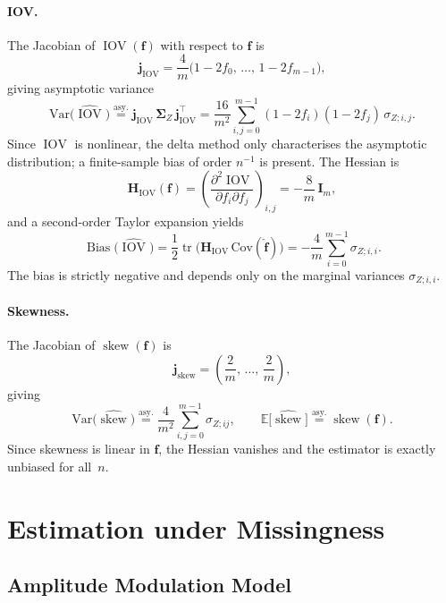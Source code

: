 \documentclass[12pt,a4paper]{scrreprt}
\DeclareMathOperator{\IOV}{IOV}
\DeclareMathOperator{\Bias}{Bias}
\begin{document}
\paragraph{IOV.}
The Jacobian of $\IOV(\mathbf{f})$ with respect to $\mathbf{f}$ is
\[
    \mathbf{j}_{\IOV}
    = \frac{4}{m}\bigl(1-2f_0,\, \ldots,\, 1-2f_{m-1}\bigr),
\]
giving asymptotic variance
\[
    \mathrm{Var}\bigl(\widehat{\IOV}\bigr)
    \overset{\mathrm{asy.}}{=}
    \mathbf{j}_{\IOV}\,\boldsymbol{\Sigma}_Z\,\mathbf{j}_{\IOV}^{\top}
    = \frac{16}{m^2} \sum_{i,j=0}^{m-1}(1-2f_i)(1-2f_j)\,\sigma_{Z;i,j}.
\]
Since $\IOV$ is nonlinear, the delta method only characterises the asymptotic distribution; a
finite-sample bias of order $n^{-1}$ is present. The Hessian is
\[
    \mathbf{H}_{\IOV}(\mathbf{f})
    = \left(\frac{\partial^2 \IOV}{\partial f_i \partial f_j}\right)_{i,j}
    = -\frac{8}{m}\,\mathbf{I}_m,
\]
and a second-order Taylor expansion yields
\[
    \Bias\bigl(\widehat{\IOV}\bigr)
    = \frac{1}{2}\operatorname{tr}\bigl(\mathbf{H}_{\IOV}\,\mathrm{Cov}(\hat{\mathbf{f}})\bigr)
    = -\frac{4}{m}\sum_{i=0}^{m-1}\sigma_{Z;i,i}.
\]
The bias is strictly negative and depends only on the marginal variances $\sigma_{Z;i,i}$.

\paragraph{Skewness.}
The Jacobian of $\operatorname{skew}(\mathbf{f})$ is
\[
    \mathbf{j}_{\mathrm{skew}}
    = \left(\frac{2}{m},\, \ldots,\, \frac{2}{m}\right),
\]
giving
\[
    \mathrm{Var}\bigl(\widehat{\operatorname{skew}}\bigr)
    \overset{\mathrm{asy.}}{=}
    \frac{4}{m^2}\sum_{i,j=0}^{m-1}\sigma_{Z;ij},
    \qquad
    \mathbb{E}\bigl[\widehat{\operatorname{skew}}\bigr]
    \overset{\mathrm{asy.}}{=} \operatorname{skew}(\mathbf{f}).
\]
Since skewness is linear in $\mathbf{f}$, the Hessian vanishes and the estimator is exactly
unbiased for all~$n$.

\section{Estimation under Missingness}

\subsection{Amplitude Modulation Model}
\end{document}
